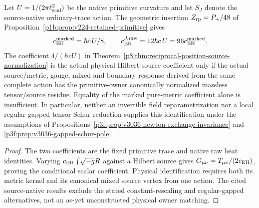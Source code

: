 \documentclass[12pt,a4paper]{article}
\begin{document}
\begin{proposition}
\label{p8:prop:v3036-newton-physical-matching-criterion}
Let $U=1/(2\pi\ell_{\rm scal}^2)$ be the native primitive curvature
and let $S_J$ denote the source-native ordinary-trace action.
The geometric insertion $Z_{\rm rp}=P_+/48$ of
Proposition~\ref{p1b:prop:v224-retained-primitive} gives
\[
 c_{\rm EH}^{\rm marked}=\hbar c\,U/8,
 \qquad c_{\rm EH}^{J,\rm raw}=12\hbar c\,U
 =96c_{\rm EH}^{\rm marked}.
\]
The coefficient $4/(\hbar cU)$ in
Theorem~\ref{p8:thm:reciprocal-position-source-normalization}
is the actual physical Hilbert-source coefficient only if the actual
source/metric, gauge, mixed and boundary response derived from the same
complete action has the primitive-owner canonically normalized
massless tensor/source residue.  Equality of the marked pure-metric
coefficient alone is insufficient.  In particular, neither an
invertible field reparametrization nor a local regular gapped tensor
Schur reduction supplies this identification under the assumptions of
Propositions~\ref{p3f:prop:v3036-newton-exchange-invariance} and
\ref{p3f:prop:v3036-gapped-schur-pole}.
\end{proposition}
\begin{proof}
The two coefficients are the fixed primitive trace and native raw
heat identities. Varying $c_{\rm EH}\int\!\sqrt{-g}R$ against a Hilbert
source gives $G_{\mu\nu}=T_{\mu\nu}/(2c_{\rm EH})$, proving the
conditional scalar coefficient. Physical identification requires
both its metric kernel and its canonical mixed source vertex from
one action. The cited source-native results exclude the stated
constant-rescaling and regular-gapped alternatives, not an as-yet
unconstructed physical owner matching.
\end{proof}
\end{document}
